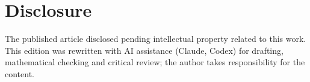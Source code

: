 \documentclass[11pt,a4paper]{article}
\begin{document}
\section*{Disclosure}
The published article disclosed pending intellectual property related to this work. This edition was rewritten with AI assistance (Claude, Codex) for drafting, mathematical checking and critical review; the author takes responsibility for the content.


\setlength{\bibsep}{3pt plus 1pt minus 1pt}

\end{document}

